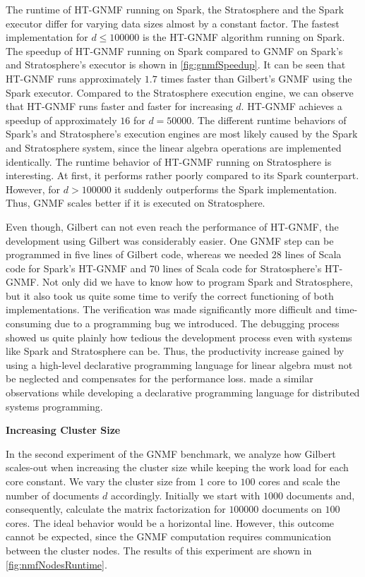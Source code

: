 The runtime of HT-GNMF running on Spark, the Stratosphere and the Spark executor differ for varying data sizes almost by a constant factor.
The fastest implementation for $d\le 100000$ is the HT-GNMF algorithm running on Spark.
The speedup of HT-GNMF running on Spark compared to GNMF on Spark's and Stratosphere's executor is shown in \cref{fig:gnmfSpeedup}.
It can be seen that HT-GNMF runs approximately $1.7$ times faster than Gilbert's GNMF using the Spark executor.
Compared to the Stratosphere execution engine, we can observe that HT-GNMF runs faster and faster for increasing $d$.
HT-GNMF achieves a speedup of approximately $16$ for $d=50000$.
The different runtime behaviors of Spark's and Stratosphere's execution engines are most likely caused by the Spark and Stratosphere system, since the linear algebra operations are implemented identically.
The runtime behavior of HT-GNMF running on Stratosphere is interesting.
At first, it performs rather poorly compared to its Spark counterpart.
However, for $d>100000$ it suddenly outperforms the Spark implementation.
Thus, GNMF scales better if it is executed on Stratosphere. 

Even though, Gilbert can not even reach the performance of HT-GNMF, the development using Gilbert was considerably easier.
One GNMF step can be programmed in five lines of Gilbert code, whereas we needed $28$ lines of Scala code for Spark's HT-GNMF and $70$ lines of Scala code for Stratosphere's HT-GNMF.
Not only did we have to know how to program Spark and Stratosphere, but it also took us quite some time to verify the correct functioning of both implementations.
The verification was made significantly more difficult and time-consuming due to a programming bug we introduced.
The debugging process showed us quite plainly how tedious the development process even with systems like Spark and Stratosphere can be.
Thus, the productivity increase gained by using a high-level declarative programming language for linear algebra must not be neglected and compensates for the performance loss.
\cite{alvaro:2010a} made a similar observations while developing a declarative programming language for distributed systems programming.

\textbf{Increasing Cluster Size}

In the second experiment of the GNMF benchmark, we analyze how Gilbert scales-out when increasing the cluster size while keeping the work load for each core constant.
We vary the cluster size from $1$ core to $100$ cores and scale the number of documents $d$ accordingly.
Initially we start with $1000$ documents and, consequently, calculate the matrix factorization for $100000$ documents on $100$ cores.
The ideal behavior would be a horizontal line.
However, this outcome cannot be expected, since the GNMF computation requires communication between the cluster nodes.
The results of this experiment are shown in \cref{fig:nmfNodesRuntime}.


